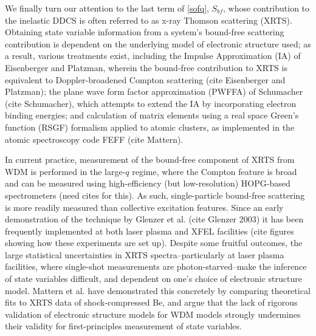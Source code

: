 \documentclass [11pt, proquest, article] {uwthesis}[2016/11/22]
\begin{document}
We finally turn our attention to the last term of \ref{sofq}, $S_{bf}$, whose contribution to the inelastic DDCS is often referred to as x-ray Thomson scattering (XRTS). Obtaining state variable information from a system's bound-free scattering contribution is dependent on the underlying model of electronic structure used; as a result, various treatments exist, including the Impulse Approximation (IA) of Eisenberger and Platzman, wherein the bound-free contribution to XRTS is equivalent to Doppler-broadened Compton scattering (cite Eisenberger and Platzman); the plane wave form factor approximation (PWFFA) of Schumacher (cite Schumacher), which attempts to extend the IA by incorporating electron binding energies; and calculation of matrix elements using a real space Green's function (RSGF) formalism applied to atomic clusters, as implemented in the atomic spectroscopy code FEFF (cite Mattern).


In current practice, measurement of the  bound-free component of XRTS from WDM is performed in the large-$q$ regime, where the Compton feature is broad and can be measured using high-efficiency (but low-resolution) HOPG-based spectrometers (need cites for this). As such, single-particle bound-free scattering is more readily measured than collective excitation features. Since an early demonstration of the technique by Glenzer et al. (cite Glenzer 2003) it has been frequently implemented at both laser plasma and XFEL facilities (cite figures showing how these experiments are set up). Despite some fruitful outcomes, the large statistical uncertainties in XRTS spectra--particularly at laser plasma facilities, where single-shot measurements are photon-starved--make the inference of state variables difficult, and dependent on one's choice of electronic structure model. Mattern et al. have demonstrated this concretely by comparing theoretical fits to XRTS data of shock-compressed Be, and argue that the lack of rigorous validation of electronic structure models for WDM models strongly undermines their validity for first-principles measurement of state variables. 
\end{document}
